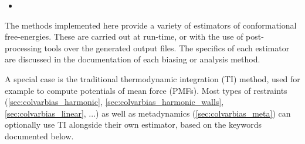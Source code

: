 \begin{itemize}
\item %

\end{itemize}



The methods implemented here provide a variety of estimators of conformational free-energies.
These are carried out at run-time, or with the use of post-processing tools over the generated output files.
The specifics of each estimator are discussed in the documentation of each biasing or analysis method.

A special case is the traditional thermodynamic integration (TI) method, used for example to compute potentials of mean force (PMFs).
Most types of restraints (\ref{sec:colvarbias_harmonic}, \ref{sec:colvarbias_harmonic_walls}, \ref{sec:colvarbias_linear}, ...) as well as metadynamics (\ref{sec:colvarbias_meta}) can optionally use TI alongside their own estimator, based on the keywords documented below.

